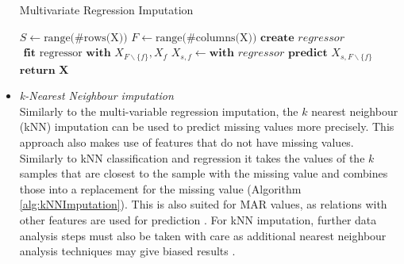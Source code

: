 \documentclass[10pt,a4paper]{report}
\begin{document}
\begin{itemize}
		\begin{algorithm}[H]
			\caption{Multivariate Regression Imputation}\label{alg:RegressionImputation}
			\begin{algorithmic}[1]
				\State $S \gets \text{range(\#rows(X))}$ 	
				\State $F \gets \text{range(\#columns(X))}$ 	
				 					
				 				 			
				\State $\textbf{create } \textit{regressor}$	
				\State $\textbf{ fit } \text{regressor} \textbf{ with } X_{F \backslash\{f\}}, X_f$	
				 
				 
				\State $X_{s,f} \gets \textbf{with }\textit{regressor} \textbf{ predict } X_{s, F \backslash \{f\}}$ 
				\EndIf
				\EndFor
				\EndIf
				\EndFor
				\State $\textbf{return X}$
				\EndProcedure
			\end{algorithmic}
		\end{algorithm}	
		
		\item \textit{k-Nearest Neighbour imputation} \\
		Similarly to the multi-variable regression imputation, the $k$ nearest neighbour (kNN) imputation can be used to predict missing values more precisely. This approach also makes use of features that do not have missing values. Similarly to kNN classification and regression it takes the values of the $k$ samples that are closest to the sample with the missing value and combines those into a replacement for the missing value (Algorithm \ref{alg:kNNImputation}). This is also suited for MAR values, as relations with other features are used for prediction \cite{myrtveit2001analyzing, cartwright2003dealing}. For kNN imputation, further data analysis steps must also be taken with care as additional nearest neighbour analysis techniques may give biased results \cite{donders2006gentle}.
		

\end{itemize}
\end{document}
